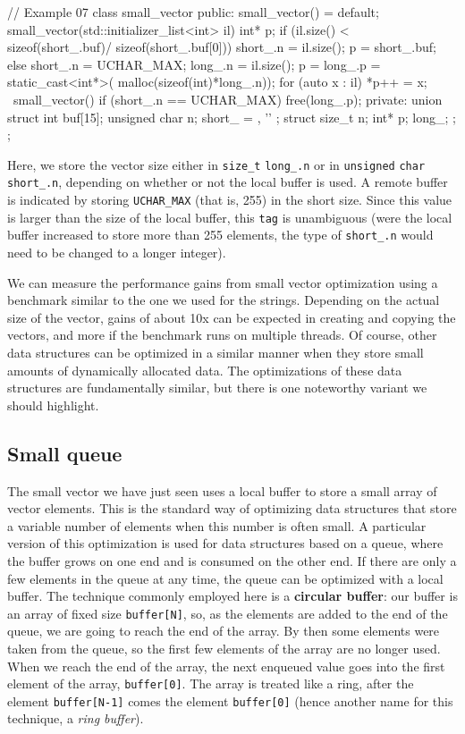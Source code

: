 \begin{code}
// Example 07
class small_vector {
  public:
  small_vector() = default;
  small_vector(std::initializer_list<int> il) {
    int* p;
    if (il.size() < sizeof(short_.buf)/
                    sizeof(short_.buf[0])) {
      short_.n = il.size();
      p = short_.buf;
    } else {
      short_.n = UCHAR_MAX;
      long_.n = il.size();
      p = long_.p = static_cast<int*>(
        malloc(sizeof(int)*long_.n));
    }
    for (auto x : il) *p++ = x;
  }
  ~small_vector() {
    if (short_.n == UCHAR_MAX) free(long_.p);
  }
  private:
  union {
    struct {
      int buf[15];
      unsigned char n;
    } short_ = { {}, '\0' };
    struct {
      size_t n;
      int* p;
    } long_;
  };
};
\end{code}

Here, we store the vector size either in \texttt{size\_t} \texttt{long\_.n} or in \texttt{unsigned} \texttt{char} \texttt{short\_.n}, depending on whether or not the local buffer is used. A remote buffer is indicated by storing \texttt{UCHAR\_MAX} (that is, 255) in the short size. Since this value is larger than the size of the local buffer, this \texttt{tag} is unambiguous (were the local buffer increased to store more than 255 elements, the type of \texttt{short\_.n} would need to be changed to a longer integer).

We can measure the performance gains from small vector optimization using a benchmark similar to the one we used for the strings. Depending on the actual size of the vector, gains of about 10x can be expected in creating and copying the vectors, and more if the benchmark runs on multiple threads. Of course, other data structures can be optimized in a similar manner when they store small amounts of dynamically allocated data. The optimizations of these data structures are fundamentally similar, but there is one noteworthy variant we should highlight.

\subsection{Small queue}

The small vector we have just seen uses a local buffer to store a small array of vector elements. This is the standard way of optimizing data structures that store a variable number of elements when this number is often small. A particular version of this optimization is used for data structures based on a queue, where the buffer grows on one end and is consumed on the other end. If there are only a few elements in the queue at any time, the queue can be optimized with a local buffer. The technique commonly employed here is a \textbf{circular buffer}: our buffer is an array of fixed size \texttt{buffer{[}N{]}}, so, as the elements are added to the end of the queue, we are going to reach the end of the array. By then some elements were taken from the queue, so the first few elements of the array are no longer used. When we reach the end of the array, the next enqueued value goes into the first element of the array, \texttt{buffer{[}0{]}}. The array is treated like a ring, after the element \texttt{buffer{[}N-1{]}} comes the element \texttt{buffer{[}0{]}} (hence another name for this technique, a \emph{ring buffer}).

